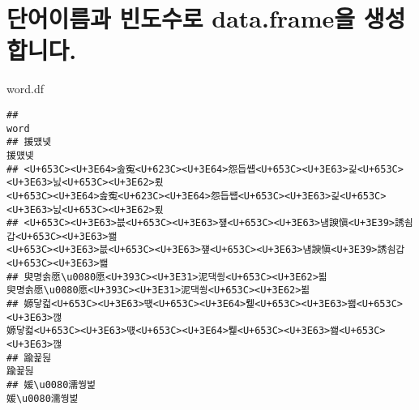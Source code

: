 \documentclass[]{article}
\newenvironment{Shaded}{\begin{snugshade}}{\end{snugshade}}
\newcommand{\NormalTok}[1]{#1}
\begin{document}
\section{단어이름과 빈도수로 data.frame을
생성합니다.}\label{--data.frame-.}

\begin{Shaded}
\begin{Highlighting}[]
\NormalTok{word.df}
\end{Highlighting}
\end{Shaded}

\begin{verbatim}
##                                                                                                                                                                                                                          word
## 援먰넻                                                                                                                                                                                                                 援먰넻
## <U+653C><U+3E64>솚寃<U+623C><U+3E64>怨듭썝<U+653C><U+3E63>긽<U+653C><U+3E63>닔<U+653C><U+3E62>룄                                                                                         <U+653C><U+3E64>솚寃<U+623C><U+3E64>怨듭썝<U+653C><U+3E63>긽<U+653C><U+3E63>닔<U+653C><U+3E62>룄
## <U+653C><U+3E63>븞<U+653C><U+3E63>쟾<U+653C><U+3E63>냼諛愼<U+3E39>誘쇰갑<U+653C><U+3E63>쐞                                                                                               <U+653C><U+3E63>븞<U+653C><U+3E63>쟾<U+653C><U+3E63>냼諛愼<U+3E39>誘쇰갑<U+653C><U+3E63>쐞
## 臾명솕愿\u0080愿<U+393C><U+3E31>泥댁쑁<U+653C><U+3E62>뵒                                                                                                                                     臾명솕愿\u0080愿<U+393C><U+3E31>泥댁쑁<U+653C><U+3E62>뵒
## 嫄닿컯<U+653C><U+3E63>떇<U+653C><U+3E64>뭹<U+653C><U+3E63>쐞<U+653C><U+3E63>깮                                                                                                                 嫄닿컯<U+653C><U+3E63>떇<U+653C><U+3E64>뭹<U+653C><U+3E63>쐞<U+653C><U+3E63>깮
## 踰꾩뒪                                                                                                                                                                                                                 踰꾩뒪
## 媛\u0080濡쒕벑                                                                                                                                                                                                 媛\u0080濡쒕벑

\end{verbatim}
\end{document}
